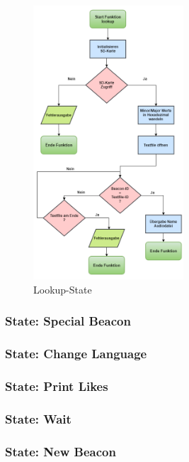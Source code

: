 \begin{figure}[htbp!!!!]
	\centering
	\includegraphics[width=0.5\textwidth]{Data/lookup_picture}
	\caption[Statemachine: lookup]{Lookup-State}
	\label{fig:lookupState}
\end{figure} 

\subsubsection*{State: Special Beacon}

\subsubsection*{State: Change Language}

\subsubsection*{State: Print \glqq Likes \grqq}

\subsubsection*{State: Wait}

\subsubsection*{State: New Beacon}

